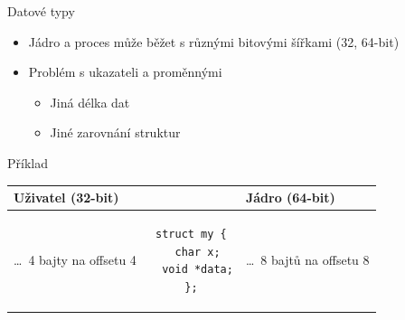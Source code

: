 \begin{frame}[fragile]{Datové typy}

  \begin{itemize}
    \item Jádro a proces může běžet s různými bitovými šířkami (32, 64-bit)

    \pause

    \item Problém s ukazateli a  proměnnými
    \begin{itemize}
      \item Jiná délka dat
      \item Jiné zarovnání struktur
    \end{itemize}
  \end{itemize}

  \pause

  \begin{block}{Příklad}
    \begin{center}
      \begin{tabular}{|p{2.8cm}|c|p{2.8cm}|} \hline
	Uživatel (32-bit) & & Jádro (64-bit) \\ \hline
	\code{data} \dots\ 4 bajty na offsetu 4 &
	\begin{lstlisting}
struct my {
  char x;
  void *data;
};
	\end{lstlisting} &
	\code{data} \dots\ 8 bajtů na offsetu 8 \\ \hline
      \end{tabular}
    \end{center}
  \end{block}

\end{frame}

